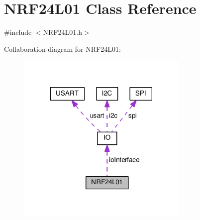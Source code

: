 \hypertarget{classNRF24L01}{}\section{N\+R\+F24\+L01 Class Reference}
\label{classNRF24L01}


{\ttfamily \#include $<$N\+R\+F24\+L01.\+h$>$}



Collaboration diagram for N\+R\+F24\+L01\+:\nopagebreak
\begin{figure}[H]
\begin{center}
\leavevmode
\includegraphics[width=233pt]{classNRF24L01__coll__graph}
\end{center}
\end{figure}
